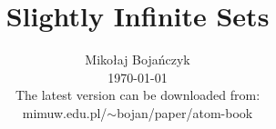 \documentclass{book}
\theoremstyle{plain}%
\theoremstyle{definition}
\newcommand{\ifcambridge}[1]{

}
\begin{document}
  

 \title 
 {Slightly Infinite Sets}
\author{Miko{\l}aj Boja\'nczyk\\[3\baselineskip]
\today \\ The latest version can be downloaded from:\\
 mimuw.edu.pl/$\sim$bojan/paper/atom-book 
 }
 \ifcambridge{
\bookabstract{This is the guide for authors who are preparing written,
 rather than edited, books.}}
\ifcambridge{\bookkeywords{\LaTeX; authored books; CUP style; cambridge7A.cls.}}
\frontmatter 
\maketitle
 
\tableofcontents

\mainmatter 
 
 
\begin{scope}




\end{scope}




 

 
 





 
 
 
 \backmatter
% 
% 
% 
  {\vspace{\baselineskip}}
 
 \renewcommand{\refname}{Bibliography}%
\ifcambridge{\bookreferences %
}
 \label{refs}
 

 \cleardoublepage

 




 
\end{document}
